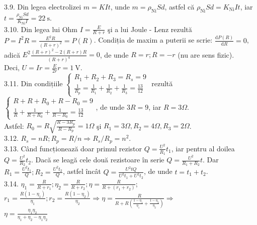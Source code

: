 3.9. Din legea electrolizei $m=K I t$, unde $m=\rho_{\mathrm{Ni}} S d$, astfel că $\rho_{\mathrm{Ni}} S d=K_{\mathrm{Ni}} I t$, iar $t=\frac{\rho_{\mathrm{Ni}} S d}{K_{\mathrm{Ni}} I}=22 \mathrm{~s}$.\\

3.10. Din legea lui Ohm $I=\frac{E}{R+r}$ şi a lui Joule - Lenz rezultă $P=I^{2} R=\frac{E^{2} R}{(R+r)^{2}}=P(R)$. Condiția de maxim a puterii se scrie: $\frac{\mathrm{d} P(R)}{\mathrm{d} R}=0$, adică $E^{2} \frac{(R+r)^{2}-2(R+r) R}{(R+r)^{4}}=0$, de unde $R=r ; R=-r$ (nu are sens fizic).\\ Deci, $U=I r=\frac{E}{2 r} r=1 \mathrm{~V}$.\\

3.11. Din condițiile $\left\{\begin{array}{l}R_{1}+R_{2}+R_{3}=R_{s}=9 \\ \frac{1}{R_{p}}=\frac{1}{R_{1}}+\frac{1}{R_{2}}+\frac{1}{R_{3}}=\frac{13}{12}\end{array}\right.$ rezultă $\left\{\begin{array}{l}R+R+R_{0}+R-R_{0}=9 \\ \frac{1}{R}+\frac{1}{R+R_{0}}+\frac{1}{R-R_{0}}=\frac{13}{12}\end{array}\right.$, de unde $3 R=9$, iar $R=3 \Omega$.\\ Astfel: $R_{0}=R \sqrt{\frac{R-3 R_{p}}{R-R_{p}}}=1 \Omega$ şi $R_{1}=3 \Omega, R_{2}=4 \Omega, R_{3}=2 \Omega$.\\

3.12. $R_{s}=n R ; R_{p}=R / n \Rightarrow R_{s} / R_{p}=n^{2}$.\\

3.13. Când funcționează doar primul rezistor $Q=\frac{U^{2}}{R_{1}} t_{1}$, iar pentru al doilea $Q=\frac{U^{2}}{R_{2}} t_{2}$. Dacă se leagă cele două rezistoare în serie $Q=\frac{U^{2}}{R_{1}+R_{2}} t$. Dar $R_{1}=\frac{U^{2} t_{1}}{Q} ; R_{2}=\frac{U^{2} t_{2}}{Q}$, astfel încât $Q=\frac{U^{2} t Q}{U^{2} t_{1}+U^{2} t_{2}}$, de unde $t=t_{1}+t_{2}$.\\

3.14. $\eta_{1}=\frac{R}{R+r_{1}} ; \eta_{2}=\frac{R}{R+r_{2}} ; \eta=\frac{R}{R+\left(r_{1}+r_{2}\right)}$;\\ $r_{1}=\frac{R\left(1-\eta_{1}\right)}{\eta_{1}} ; r_{2}=\frac{R\left(1-\eta_{2}\right)}{\eta_{2}} \Rightarrow \eta=\frac{R}{R+R\left(\frac{1-\eta_{1}}{\eta_{1}}+\frac{1-\eta_{2}}{\eta_{2}}\right)} \Rightarrow$\\ $\eta=\frac{\eta_{1} \eta_{2}}{\eta_{1}+\eta_{2}-\eta_{1} \eta_{2}}$\\

